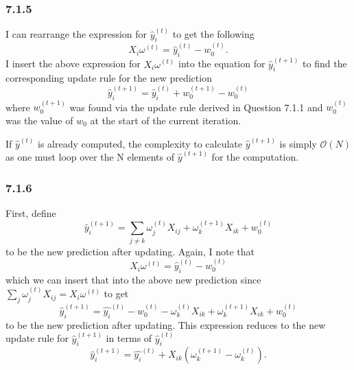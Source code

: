 \documentclass[12pt]{amsart}
\begin{document}
\subsubsection*{7.1.5}

I can rearrange the expression for $\hat{y}_i^{(t)}$ to get the following
\begin{equation}
X_i \omega^{(t)} = \hat{y}_i^{(t)} - w_0^{(t)}.
\end{equation}
I insert the above expression for $X_i \omega^{(t)}$ into the equation for $\hat{y}_i^{(t+1)}$ to find the corresponding update rule for the new prediction
\begin{equation}
\hat{y}_i^{(t+1)} = \hat{y}_i^{(t)} + w_0^{(t+1)} - w_0^{(t)}
\end{equation}
where $w_0^{(t+1)}$ was found via the update rule derived in Question 7.1.1 and $w_0^{(t)}$ was the value of $w_0$ at the start of the current iteration.  

If $\hat{y}^{(t)}$ is already computed, the complexity to calculate $\hat{y}^{(t+1)}$ is simply $\mathcal{O}(N)$ as one must loop over the N elements of $\hat{y}^{(t+1)}$ for the computation.

\subsubsection*{7.1.6}

First, define
\begin{equation}
\hat{y}_i^{(t+1)} = \sum_{j \neq k} \omega_j^{(t)}X_{ij} + \omega_k^{(t+1)}X_{ik} + w_0^{(t)}
\end{equation}
to be the new prediction after updating.
Again, I note that 
\begin{equation}
X_i \omega^{(t)} = \hat{y}_i^{(t)} - w_0^{(t)}
\end{equation}
which we can insert that into the above new prediction since $\sum_{j} \omega_j^{(t)}X_{ij} = X_i \omega^{(t)} $ to get 
\begin{equation}
\hat{y}_i^{(t+1)} = \hat{y_i}^{(t)} - w_0^{(t)} - \omega_k^{(t)}X_{ik} + \omega_k^{(t+1)}X_{ik} + w_0^{(t)}
\end{equation}
to be the new prediction after updating.  This expression reduces to the new update rule for $\hat{y}_i^{(t+1)}$ in terms of $\hat{y}_i^{(t)}$
\begin{equation}
\hat{y}_i^{(t+1)} = \hat{y_i}^{(t)} + X_{ik}(\omega_k^{(t+1)} - \omega_k^{(t)}).
\end{equation}
\end{document}
